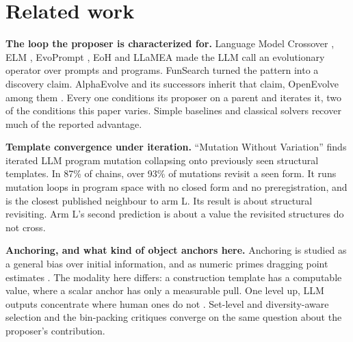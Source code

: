 \section{Related work}\label{sec:related}

\textbf{The loop the proposer is characterized for.} Language Model Crossover
\citep{meyerson2024languagemodelcrossovervariation}, ELM
\citep{lehman2022evolutionlargemodels}, EvoPrompt \citep{guo2024evoprompt}, EoH
\citep{liu2024eoh} and LLaMEA \citep{vanstein2025llamealargelanguagemodel} made the LLM call
an evolutionary operator over prompts and programs. FunSearch
\citep{romeraparedes2024funsearch} turned the pattern into a discovery claim. AlphaEvolve
\citep{novikov2025alphaevolve} and its successors inherit that claim, OpenEvolve
\citep{sharma2025openevolve} among them
\citep{lange2025shinkaevolveopenendedsampleefficientprogram,su2026helixevolutionaryreinforcementlearning,khrulkov2025gigaevoopensourceoptimization,cemri2026adaevolveadaptivellmdriven,wang2025thetaevolvetesttimelearningopen}.
Every one conditions its proposer on a parent and iterates it, two of the conditions this
paper varies. Simple baselines \citep{gideoni2026simplebaselinescompetitivecode} and
classical solvers \citep{berthold2026outoftheboxglobaloptimizationpacking} recover much of
the reported advantage.

\textbf{Template convergence under iteration.} ``Mutation Without Variation''
\citep{gurkan2026mutationvariationconvergencedynamics} finds iterated LLM program mutation
collapsing onto previously seen structural templates. In 87\% of chains, over 93\% of
mutations revisit a seen form. It runs mutation loops in program space with no closed form
and no preregistration, and is the closest published neighbour to arm L. Its result is about
structural revisiting. Arm L's second prediction is about a value the revisited structures
do not cross.

\textbf{Anchoring, and what kind of object anchors here.} Anchoring is studied as a general
bias over initial information, and as numeric primes dragging point estimates
\citep{huang2026understandinganchoringeffectllm,lou2024anchoringbiaslargelanguage,malberg2025comprehensiveevaluationcognitivebiases}.
The modality here differs: a construction template has a computable value, where a scalar
anchor has only a measurable pull. One level up, LLM outputs concentrate where human ones do
not \citep{chen2026measuringgaphumanllm,jiang2025artificialhivemindopenendedhomogeneity}.
Set-level and diversity-aware selection
\citep{li2026dictionariesdarwinsetlevelselection,wang2026diversescientifichypothesissearch,yang2026accuracyevaluatingstrategydiversity}
and the bin-packing critiques
\citep{herrmann2026indepthstudyllmcontributions,sim2025hypebenchmarkingllmevolvedheuristics}
converge on the same question about the proposer's contribution.

